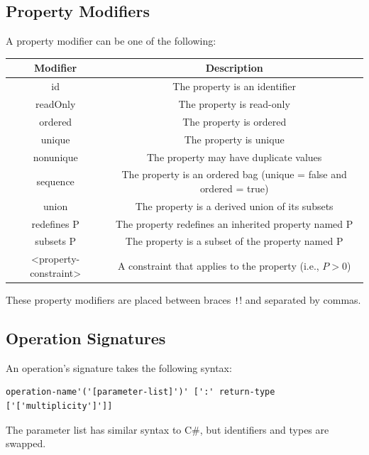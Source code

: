 \documentclass{article}
\begin{document}
\subsection{Property Modifiers}
A property modifier can be one of the following:
\begin{table}[H]
    \centering
    \begin{tabular}{c c}
        \toprule
        \textbf{Modifier}     & \textbf{Description}                                               \\
        \midrule
        id                    & The property is an identifier                                      \\
        readOnly              & The property is read-only                                          \\
        ordered               & The property is ordered                                            \\
        unique                & The property is unique                                             \\
        nonunique             & The property may have duplicate values                             \\
        sequence              & The property is an ordered bag (unique = false and ordered = true) \\
        union                 & The property is a derived union of its subsets                     \\
        redefines P           & The property redefines an inherited property named P               \\
        subsets P             & The property is a subset of the property named P                   \\
        <property-constraint> & A constraint that applies to the property (i.e., \(P>0\))          \\
        \bottomrule
    \end{tabular}
\end{table}
These property modifiers are placed between braces \texttt!{}! and separated by commas.
\subsection{Operation Signatures}
An operation's signature takes the following syntax:
\begin{verbatim}
operation-name'('[parameter-list]')' [':' return-type ['['multiplicity']']]
\end{verbatim}
The parameter list has similar syntax to C\#, but identifiers and types
are swapped.
\end{document}
